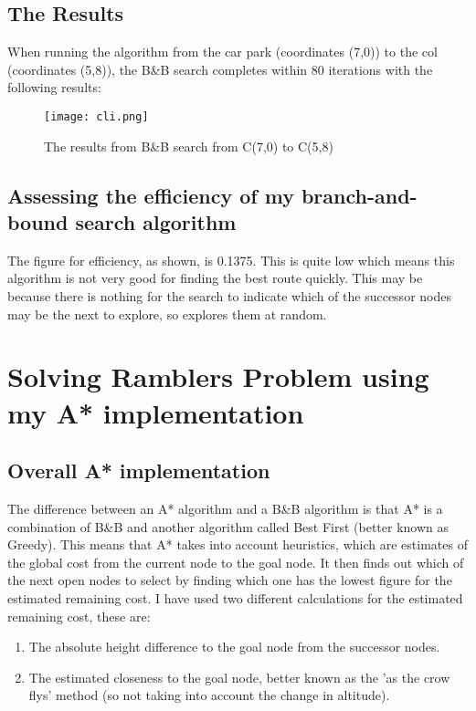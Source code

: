 \documentclass[11pt,oneside]{article}
\begin{document}
\subsection{The Results}

When running the algorithm from the car park (coordinates (7,0)) to the col (coordinates (5,8)), the B&B search completes within 80 iterations with the following results:


\begin{figure}[!ht]
\centering
  \texttt{[image: cli.png]}
  \caption{The results from B&B search from C(7,0) to C(5,8)}
  \label{fig:cli}
\end{figure}

\subsection{Assessing the efficiency of my branch-and-bound search algorithm}

The figure for efficiency, as shown, is 0.1375. This is quite low which means this algorithm is not very good for finding the best route quickly. This may be because there is nothing for the search to indicate which of the successor nodes may be the next to explore, so explores them at random.


\section{Solving Ramblers Problem using my A* implementation}

\subsection{Overall A* implementation}

The difference between an A* algorithm and a B&B algorithm is that A* is a combination of B&B and another algorithm called Best First (better known as Greedy). This means that A* takes into account heuristics, which are estimates of the global cost from the current node to the goal node. It then finds out which of the next open nodes to select by finding which one has the lowest figure for the estimated remaining cost. I have used two different calculations for the estimated remaining cost, these are: 


\begin{enumerate}
  \item The absolute height difference to the goal node from the successor nodes.
  \item The estimated closeness to the goal node, better known as the 'as the crow flys' method (so not taking into account the change in altitude).
\end{enumerate}
\end{document}
